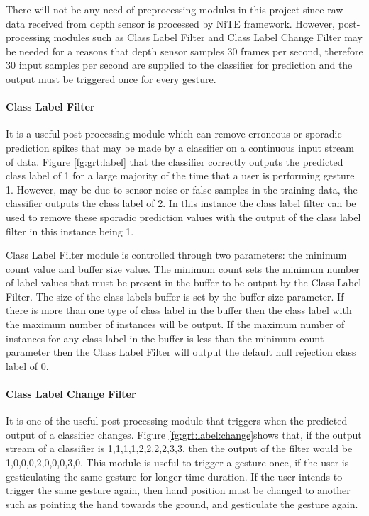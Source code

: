 There will not be any need of preprocessing modules in this project since raw data received from depth sensor is processed by NiTE framework. However, post-processing modules such as Class Label Filter and Class Label Change Filter may be needed for a reasons that depth sensor samples 30 frames per second, therefore 30 input samples per second are supplied to the classifier for prediction and the output must be triggered once for every gesture. 



\paragraph*{Class Label Filter} It is a useful post-processing module which can remove erroneous or sporadic prediction spikes that may be made by a classifier on a continuous input stream of data. Figure \ref{fg:grt:label} that the classifier correctly outputs the predicted class label of 1 for a large majority of the time that a user is performing gesture 1. However, may be due to sensor noise or false samples in the training data, the classifier outputs the class label of 2. In this instance the class label filter can be used to remove these sporadic prediction values with the output of the class label filter in this instance being 1. 

Class Label Filter module is controlled through two parameters: the minimum count value and buffer size value. The minimum count sets the minimum number of label values that must be present in the buffer to be output by the Class Label Filter. The size of the class labels buffer is set by the buffer size parameter. If there is more than one type of class label in the buffer then the class label with the maximum number of instances will be output. If the maximum number of instances for any class label in the buffer is less than the minimum count parameter then the Class Label Filter will output the default null rejection class label of 0.



\paragraph*{Class Label Change Filter} It is one of the useful post-processing module that triggers when the predicted output of a classifier changes. Figure \ref{fg:grt:label:change}shows that, if the output stream of a classifier is {1,1,1,1,2,2,2,2,3,3}, then the output of the filter would be {1,0,0,0,2,0,0,0,3,0}. This module is useful to trigger a gesture once, if the user is gesticulating the same gesture for longer time duration. If the user intends to trigger the same gesture again, then hand position must be changed to another such as pointing the hand towards the ground, and gesticulate the gesture again.

